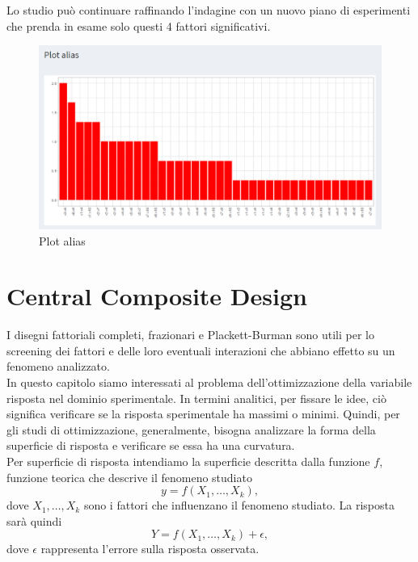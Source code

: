 \documentclass[
  11pt,
]{book}
\begin{document}
Lo studio può continuare raffinando l'indagine con un nuovo piano di esperimenti che prenda in esame solo questi 4 fattori significativi.

\begin{figure}[ht]

{\centering \includegraphics[width=1\linewidth]{Immagini/PB/04_plot_alias} 

}

\caption{Plot alias}\label{fig:pb4}
\end{figure}

\hypertarget{central-composite-design}{%
\chapter{Central Composite Design}\label{central-composite-design}}

I disegni fattoriali completi, frazionari e Plackett-Burman sono utili per lo screening dei fattori e delle loro eventuali interazioni che abbiano effetto su un fenomeno analizzato.\\
In questo capitolo siamo interessati al problema dell'ottimizzazione della variabile risposta nel dominio sperimentale. In termini analitici, per fissare le idee, ciò significa verificare se la risposta sperimentale ha massimi o minimi. Quindi, per gli studi di ottimizzazione, generalmente, bisogna analizzare la forma della superficie di risposta e verificare se essa ha una curvatura.\\
Per superficie di risposta intendiamo la superficie descritta dalla funzione \(f\), funzione teorica che descrive il fenomeno studiato
\[
    y=f(X_1,\dots,X_k),
\]
dove \(X_1,\dots,X_k\) sono i fattori che influenzano il fenomeno studiato. La risposta sarà quindi
\[
    Y=f(X_1,\dots,X_k)+\epsilon,
\]
dove \(\epsilon\) rappresenta l'errore sulla risposta osservata.
\end{document}
